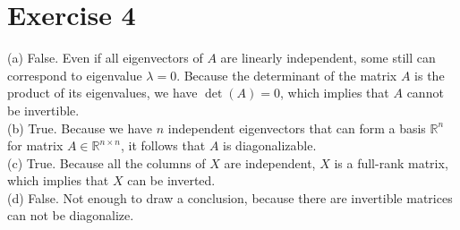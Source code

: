 \documentclass{article}
\begin{document}
\section*{Exercise 4}
(a) False. Even if all eigenvectors of \(A\) are linearly independent, some still can correspond to eigenvalue \(\lambda = 0\). Because the determinant of the matrix \(A\) is the product of its eigenvalues, we have \(\det(A) = 0\), which implies that \(A\) cannot be invertible.
\\
(b) True. Because we have \(n\) independent eigenvectors that can form a basis \(\mathbb{R}^n\) for matrix \(A \in \mathbb{R}^{n \times n}\), it follows that \(A\) is diagonalizable.
\\
(c) True. Because all the columns of \(X\) are independent, \(X\) is a full-rank matrix, which implies that \(X\) can be inverted.
\\
(d) False. Not enough to draw a conclusion, because there are invertible matrices can not be diagonalize.
\end{document}
